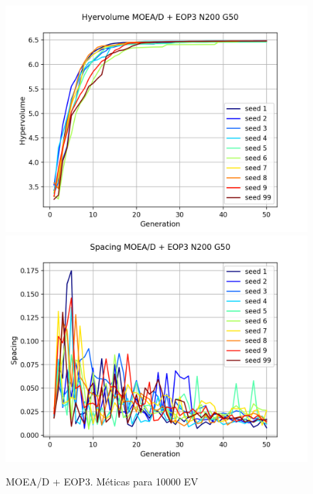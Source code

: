 \begin{figure}[H]
\centering
\includegraphics[scale=0.5]{figures/METRICS_EOP3/Hypervol_N200_G50.png}\quad 
\includegraphics[scale=0.5]{figures/METRICS_EOP3/Spacing_N200_G50.png}\\
\caption{MOEA/D + EOP3. Méticas para 10000 EV}
\label{fig:22}
\end{figure}


